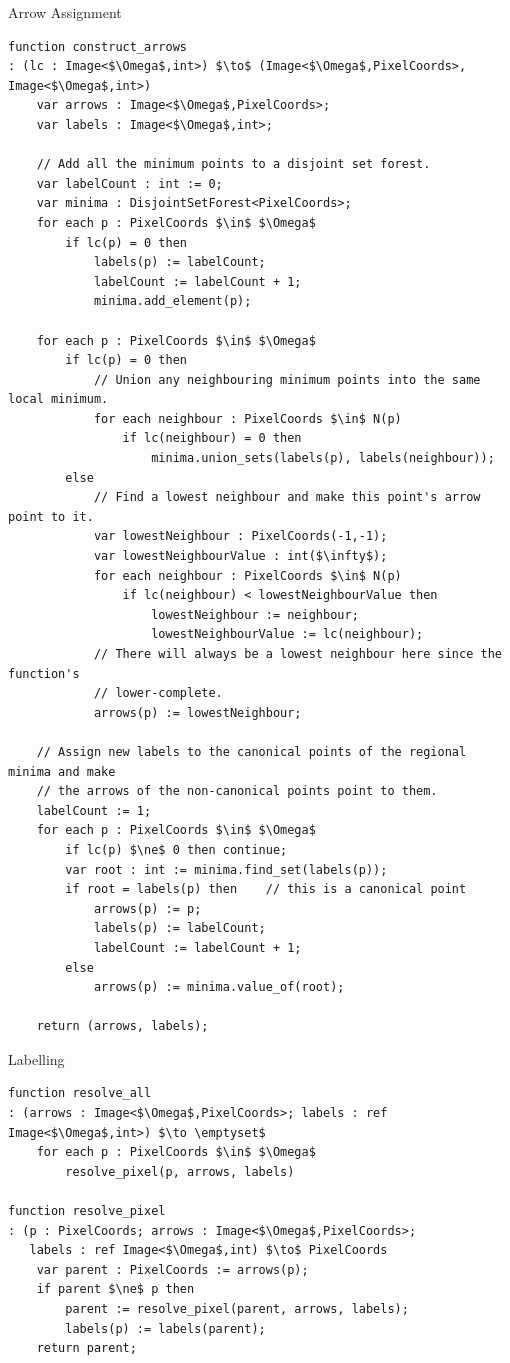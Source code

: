 \begin{stulisting}[p]
\caption{Arrow Assignment}
\label{code:segmentation-watershed-arrowassignment}
\begin{lstlisting}[style=Default]
function construct_arrows
: (lc : Image<$\Omega$,int>) $\to$ (Image<$\Omega$,PixelCoords>, Image<$\Omega$,int>)
	var arrows : Image<$\Omega$,PixelCoords>;
	var labels : Image<$\Omega$,int>;

	// Add all the minimum points to a disjoint set forest.
	var labelCount : int := 0;
	var minima : DisjointSetForest<PixelCoords>;
	for each p : PixelCoords $\in$ $\Omega$
		if lc(p) = 0 then
			labels(p) := labelCount;
			labelCount := labelCount + 1;
			minima.add_element(p);

	for each p : PixelCoords $\in$ $\Omega$
		if lc(p) = 0 then
			// Union any neighbouring minimum points into the same local minimum.
			for each neighbour : PixelCoords $\in$ N(p)
				if lc(neighbour) = 0 then
					minima.union_sets(labels(p), labels(neighbour));
		else
			// Find a lowest neighbour and make this point's arrow point to it.
			var lowestNeighbour : PixelCoords(-1,-1);
			var lowestNeighbourValue : int($\infty$);
			for each neighbour : PixelCoords $\in$ N(p)
				if lc(neighbour) < lowestNeighbourValue then
					lowestNeighbour := neighbour;
					lowestNeighbourValue := lc(neighbour);
			// There will always be a lowest neighbour here since the function's
			// lower-complete.
			arrows(p) := lowestNeighbour;

	// Assign new labels to the canonical points of the regional minima and make
	// the arrows of the non-canonical points point to them.
	labelCount := 1;
	for each p : PixelCoords $\in$ $\Omega$
		if lc(p) $\ne$ 0 then continue;
		var root : int := minima.find_set(labels(p));
		if root = labels(p) then	// this is a canonical point
			arrows(p) := p;
			labels(p) := labelCount;
			labelCount := labelCount + 1;
		else
			arrows(p) := minima.value_of(root);

	return (arrows, labels);
\end{lstlisting}
\end{stulisting}

\begin{stulisting}[p]
\caption{Labelling}
\label{code:segmentation-watershed-labelling}
\begin{lstlisting}[style=Default]
function resolve_all
: (arrows : Image<$\Omega$,PixelCoords>; labels : ref Image<$\Omega$,int>) $\to \emptyset$
	for each p : PixelCoords $\in$ $\Omega$
		resolve_pixel(p, arrows, labels)

function resolve_pixel
: (p : PixelCoords; arrows : Image<$\Omega$,PixelCoords>;
   labels : ref Image<$\Omega$,int) $\to$ PixelCoords
	var parent : PixelCoords := arrows(p);
	if parent $\ne$ p then
		parent := resolve_pixel(parent, arrows, labels);
		labels(p) := labels(parent);
	return parent;
\end{lstlisting}
\end{stulisting}

